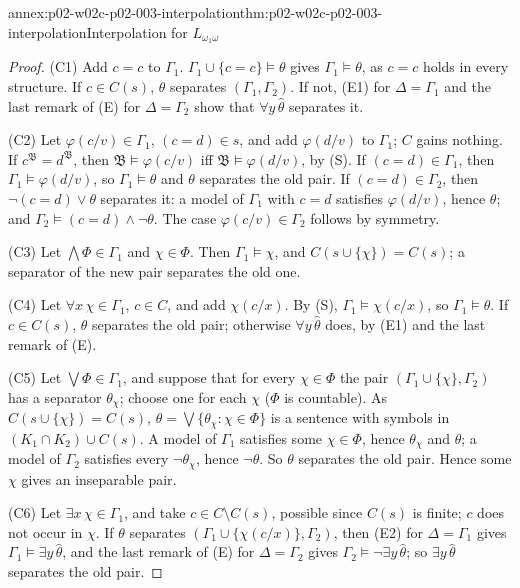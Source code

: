 \begin{annexitem}{annex:p02-w02c-p02-003-interpolation}{thm:p02-w02c-p02-003-interpolation}{Interpolation for \(L_{\omega_1\omega}\)}
\begin{proof}
(C1) Add \(c=c\) to \(\Gamma_1\).  \(\Gamma_1\cup\{c=c\}\models\theta\)
gives \(\Gamma_1\models\theta\), as \(c=c\) holds in every structure.  If
\(c\in C(s)\), \(\theta\) separates \((\Gamma_1,\Gamma_2)\).  If not, (E1)
for \(\Delta=\Gamma_1\) and the last remark of (E) for \(\Delta=\Gamma_2\)
show that \(\forall y\,\hat\theta\) separates it.

(C2) Let \(\varphi(c/v)\in\Gamma_1\), \((c=d)\in s\), and add
\(\varphi(d/v)\) to \(\Gamma_1\); \(C\) gains nothing.  If \(c^{\mathfrak
B}=d^{\mathfrak B}\), then \(\mathfrak B\models\varphi(c/v)\) iff
\(\mathfrak B\models\varphi(d/v)\), by (S).  If \((c=d)\in\Gamma_1\), then
\(\Gamma_1\models\varphi(d/v)\), so \(\Gamma_1\models\theta\) and
\(\theta\) separates the old pair.  If \((c=d)\in\Gamma_2\), then
\(\neg(c=d)\lor\theta\) separates it: a model of \(\Gamma_1\) with
\(c=d\) satisfies \(\varphi(d/v)\), hence \(\theta\); and
\(\Gamma_2\models(c=d)\land\neg\theta\).  The case
\(\varphi(c/v)\in\Gamma_2\) follows by symmetry.

(C3) Let \(\bigwedge\Phi\in\Gamma_1\) and \(\chi\in\Phi\).  Then
\(\Gamma_1\models\chi\), and \(C(s\cup\{\chi\})=C(s)\); a separator of the
new pair separates the old one.

(C4) Let \(\forall x\,\chi\in\Gamma_1\), \(c\in C\), and add
\(\chi(c/x)\).  By (S), \(\Gamma_1\models\chi(c/x)\), so
\(\Gamma_1\models\theta\).  If \(c\in C(s)\), \(\theta\) separates the old
pair; otherwise \(\forall y\,\hat\theta\) does, by (E1) and the last
remark of (E).

(C5) Let \(\bigvee\Phi\in\Gamma_1\), and suppose that for every
\(\chi\in\Phi\) the pair \((\Gamma_1\cup\{\chi\},\Gamma_2)\) has a separator
\(\theta_\chi\); choose one for each \(\chi\) (\(\Phi\) is countable).  As
\(C(s\cup\{\chi\})=C(s)\), \(\theta=\bigvee\{\theta_\chi:\chi\in\Phi\}\) is
a sentence with symbols in \((K_1\cap K_2)\cup C(s)\).  A model of
\(\Gamma_1\) satisfies some \(\chi\in\Phi\), hence \(\theta_\chi\) and
\(\theta\); a model of \(\Gamma_2\) satisfies every \(\neg\theta_\chi\),
hence \(\neg\theta\).  So \(\theta\) separates the old pair.  Hence some
\(\chi\) gives an inseparable pair.

(C6) Let \(\exists x\,\chi\in\Gamma_1\), and take \(c\in C\setminus
C(s)\), possible since \(C(s)\) is finite; \(c\) does not occur in
\(\chi\).  If \(\theta\) separates \((\Gamma_1\cup\{\chi(c/x)\},\Gamma_2)\),
then (E2) for \(\Delta=\Gamma_1\) gives \(\Gamma_1\models\exists
y\,\hat\theta\), and the last remark of (E) for \(\Delta=\Gamma_2\) gives
\(\Gamma_2\models\neg\exists y\,\hat\theta\); so \(\exists y\,\hat\theta\)
separates the old pair.


\end{proof}
\end{annexitem}
